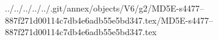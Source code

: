 ../../../../../.git/annex/objects/V6/g2/MD5E-s4477--887f271d00114c7db4e6adb55e5bd347.tex/MD5E-s4477--887f271d00114c7db4e6adb55e5bd347.tex